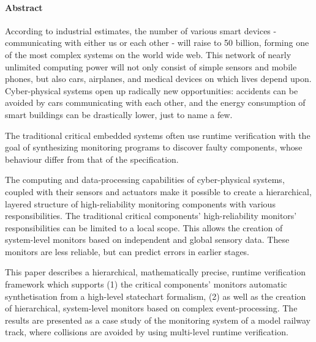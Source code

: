 \thispagestyle{plain}
\paragraph*{Abstract}

According to industrial estimates, the number of various smart devices - communicating with either us or each other - will raise to 50 billion, forming one of the most complex systems on the world wide web. This network of nearly unlimited computing power will not only consist of simple sensors and mobile phones, but also cars, airplanes, and medical devices on which lives depend upon. Cyber-physical systems open up radically new opportunities: accidents can be avoided by cars communicating with each other, and the energy consumption of smart buildings can be drastically lower, just to name a few.

The traditional critical embedded systems often use runtime verification with the goal of synthesizing monitoring programs to discover faulty components, whose behaviour differ from that of the specification.

The computing and data-processing capabilities of cyber-physical systems, coupled with their sensors and actuators make it possible to create a hierarchical, layered structure of high-reliability monitoring components with various responsibilities. The traditional critical components' high-reliability monitors' responsibilities can be limited to a local scope. This allows the creation of system-level monitors based on independent and global sensory data. These monitors are less reliable, but can predict errors in earlier stages.

This paper describes a hierarchical, mathematically precise, runtime verification framework which supports (1) the critical components' monitors automatic synthetisation from a high-level statechart formalism, (2) as well as the creation of hierarchical, system-level monitors based on complex event-processing. The results are presented as a case study of the monitoring system of a model railway track, where collisions are avoided by using multi-level runtime verification.